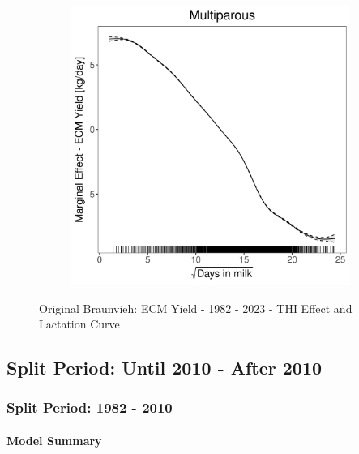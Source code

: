 \begin{figure}[H]
\begin{subfigure}[b]{0.45\textwidth}
    \end{subfigure}
    \hspace{0.05\textwidth} %
    \begin{subfigure}[b]{0.45\textwidth}
        \centering
        \includegraphics[width=\textwidth]{thesis/figures/models/ecm/full/ob_ecm_full/ob_ecm_full_marginal_dim_milk_multi.png}
    \end{subfigure}
    \caption[]{Original Braunvieh: ECM Yield - 1982 - 2023 - THI Effect and Lactation Curve}
    \label{fig:main}
\end{figure}

\subsection{Split Period: Until 2010 - After 2010}
\subsubsection{Split Period: 1982 - 2010}\label{model:ob_ecm_before}

\paragraph{Model Summary} \quad \\

